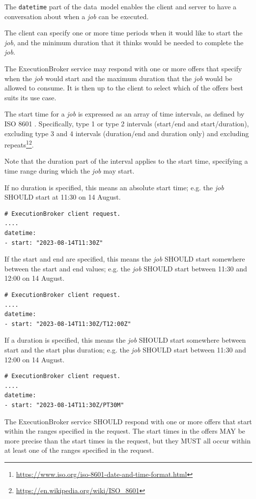 \documentclass[11pt,a4paper]{ivoa}
\newcommand{\datamodel} {data~model}
\newcommand{\execbrokerclass} {ExecutionBroker}
\newcommand{\codeword}[1] {\texttt{#1}}
\newcommand{\footurl}[1] {\footnote{\url{#1}}}
\newcommand{\job} {\textit{job}}
\begin{document}
The \codeword{datetime} part of the \datamodel{} enables the client and server to have a
conversation about when a \job{} can be executed.

The client can specify one or more time periods when it would like to start the \job{},
and the minimum duration that it thinks would be needed to complete the \job{}.

The \execbrokerclass{} service may respond with one or more offers that specify when the \job{}
would start and the maximum duration that the \job{} would be allowed to consume.
It is then up to the client to select which of the offers best suits its use case.

The start time for a \job{} is expressed as an array of time intervals, as defined by
ISO 8601 \citep{std:iso8601}.
Specifically, type 1 or type 2 intervals (start/end and start/duration), excluding type 3 and 4 intervals
(duration/end and duration only) and excluding
repeats\footurl{https://www.iso.org/iso-8601-date-and-time-format.html}\footurl{https://en.wikipedia.org/wiki/ISO_8601}.

Note that the duration part of the interval applies to the start time, specifying a
time range during which the \job{} may start.

If no duration is specified, this means an absolute start time;
e.g. the \job{} SHOULD start at 11:30 on 14 August.
\begin{lstlisting}[]
# ExecutionBroker client request.
....
datetime:
- start: "2023-08-14T11:30Z"
\end{lstlisting}

If the start and end are specified, this means the \job{} SHOULD start somewhere between
the start and end values;
e.g. the \job{} SHOULD start between 11:30 and 12:00 on 14 August.
\begin{lstlisting}[]
# ExecutionBroker client request.
....
datetime:
- start: "2023-08-14T11:30Z/T12:00Z"
\end{lstlisting}

If a duration is specified, this means the \job{} SHOULD start somewhere between
start and the start plus duration;
e.g. the \job{} SHOULD start between 11:30 and 12:00 on 14 August.
\begin{lstlisting}[]
# ExecutionBroker client request.
....
datetime:
- start: "2023-08-14T11:30Z/PT30M"
\end{lstlisting}

The \execbrokerclass{} service SHOULD respond with one or more offers that start within
the ranges specified in the request.
The start times in the offers MAY be more precise than the start times in the request,
but they MUST all occur within at least one of the ranges specified in the request.
\end{document}

